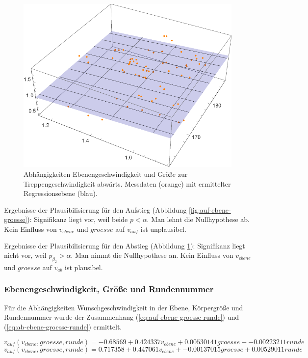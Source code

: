 \begin{figure} \centering 
	\includegraphics[]{abbildungen/regression/2017/ab-ebene-groesse.pdf}
	
	\caption{Abhängigkeiten Ebenengeschwindigkeit und Größe zur Treppengeschwindigkeit abwärts. Messdaten (orange) mit ermittelter Regressionsebene (blau). \label{fig:ab-ebene-groesse}}
\end{figure}

Ergebnisse der Plausibilisierung für den Aufstieg
(Abbildung \ref{fig:auf-ebene-groesse}):
Signifikanz liegt vor, weil beide $p < \alpha$. Man lehnt die
Nullhypothese ab. Kein Einfluss von $v_{ebene}$ und $groesse$ auf $v_{auf}$ ist unplausibel.

Ergebnisse der Plausibilisierung für den Abstieg
(Abbildung \ref{fig:ab-ebene-groesse}):
Signifikanz liegt nicht vor, weil $p_{\beta_2} > \alpha$. Man nimmt die
Nullhypothese an. Kein Einfluss von $v_{ebene}$ und $groesse$ auf $v_{ab}$ ist plausibel.


\subsubsection{Ebenengeschwindigkeit, Größe und Rundennummer}

Für die Abhängigkeiten Wunschgeschwindigkeit in der Ebene, Körpergröße und Rundennummer wurde 
der Zusammenhang (\ref{eq:auf-ebene-groesse-runde}) und (\ref{eq:ab-ebene-groesse-runde}) ermittelt.

\begin{equation} \label{eq:auf-ebene-groesse-runde}
v_{auf}(v_{ebene}, groesse, runde) = -0.68569 + 0.424337 v_{ebene} + 0.00530141 groesse + -0.00223211 runde
\end{equation}
\begin{equation} \label{eq:ab-ebene-groesse-runde}
v_{auf}(v_{ebene}, groesse, runde) = 0.717358 + 0.447061 v_{ebene} + -0.00137015 groesse + 0.00529011 runde
\end{equation}

